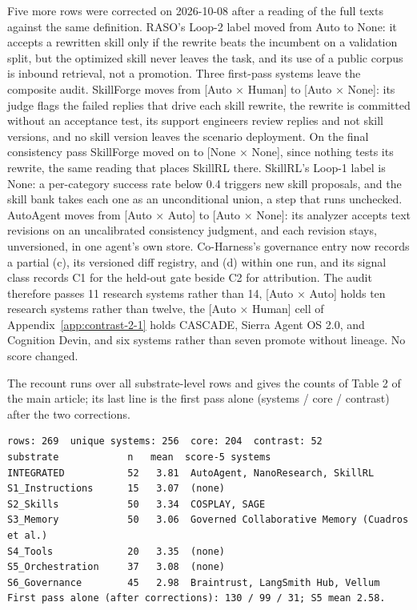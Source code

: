 \documentclass[
  11pt,
]{article}
\newcounter{none} %
\begin{document}
Five more rows were corrected on 2026-10-08 after a reading of the full texts against the same definition. RASO's Loop-2 label moved from Auto to None: it accepts a rewritten skill only if the rewrite beats the incumbent on a validation split, but the optimized skill never leaves the task, and its use of a public corpus is inbound retrieval, not a promotion. Three first-pass systems leave the composite audit. SkillForge moves from {[}Auto × Human{]} to {[}Auto × None{]}: its judge flags the failed replies that drive each skill rewrite, the rewrite is committed without an acceptance test, its support engineers review replies and not skill versions, and no skill version leaves the scenario deployment. On the final consistency pass SkillForge moved on to {[}None × None{]}, since nothing tests its rewrite, the same reading that places SkillRL there. SkillRL's Loop-1 label is None: a per-category success rate below 0.4 triggers new skill proposals, and the skill bank takes each one as an unconditional union, a step that runs unchecked. AutoAgent moves from {[}Auto × Auto{]} to {[}Auto × None{]}: its analyzer accepts text revisions on an uncalibrated consistency judgment, and each revision stays, unversioned, in one agent's own store. Co-Harness's governance entry now records a partial (c), its versioned diff registry, and (d) within one run, and its signal class records C1 for the held-out gate beside C2 for attribution. The audit therefore passes 11 research systems rather than 14, {[}Auto × Auto{]} holds ten research systems rather than twelve, the {[}Auto × Human{]} cell of Appendix~\ref{app:contrast-2-1} holds CASCADE, Sierra Agent OS 2.0, and Cognition Devin, and six systems rather than seven promote without lineage. No score changed.

The recount runs over all substrate-level rows and gives the counts of Table 2 of the main article; its last line is the first pass alone (systems / core / contrast) after the two corrections.

\begingroup\footnotesize

\begin{verbatim}
rows: 269  unique systems: 256  core: 204  contrast: 52
substrate            n   mean  score-5 systems
INTEGRATED           52   3.81  AutoAgent, NanoResearch, SkillRL
S1_Instructions      15   3.07  (none)
S2_Skills            50   3.34  COSPLAY, SAGE
S3_Memory            50   3.06  Governed Collaborative Memory (Cuadros et al.)
S4_Tools             20   3.35  (none)
S5_Orchestration     37   3.08  (none)
S6_Governance        45   2.98  Braintrust, LangSmith Hub, Vellum
First pass alone (after corrections): 130 / 99 / 31; S5 mean 2.58.
\end{verbatim}
\end{document}
